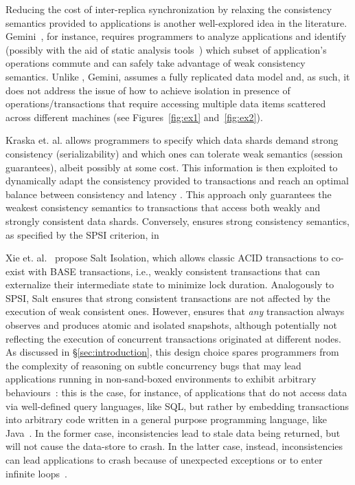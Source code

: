 Reducing the cost of inter-replica synchronization by relaxing the consistency semantics  provided to applications is another well-explored idea in the literature. Gemini~\cite{li2012making}, for instance, requires programmers to analyze applications and identify (possibly with the aid of static analysis tools~\cite{li2014automating}) which subset of application's operations commute and can safely take advantage of weak consistency semantics.  Unlike \specula, Gemini, assumes a fully replicated data model and, as such, it does not address the issue of how to achieve isolation in presence of operations/transactions that require accessing  multiple data items scattered across different machines (see Figures~\ref{fig:ex1} and~\ref{fig:ex2}). 

Kraska et. al. allows programmers to specify which data shards demand strong consistency (serializability)  and which ones can  tolerate weak semantics (session guarantees), albeit possibly at some cost. This information is then exploited to dynamically adapt the consistency provided to transactions and reach an optimal balance between consistency and latency \cite{kraska2009consistency}. This approach only guarantees the weakest consistency semantics to transactions that access both weakly and strongly consistent data shards. Conversely, \specula ensures strong consistency semantics, as specified by the SPSI criterion, in 

Xie et. al.~\cite{xie2014salt} propose Salt Isolation, which allows classic ACID transactions to co-exist with BASE transactions, i.e., weakly consistent transactions that can externalize their intermediate state to minimize lock duration. Analogously to SPSI, Salt ensures that strong consistent transactions are not affected by the execution of weak consistent ones. However,  \specula ensures that \textit{any} transaction always observes and produces atomic and isolated snapshots, although potentially not reflecting the execution of concurrent transactions originated at different nodes. As discussed in \S \ref{sec:introduction}, this design choice spares programmers from the complexity of reasoning on subtle concurrency bugs that may lead applications running in non-sand-boxed environments  to exhibit arbitrary behaviours~\cite{guerraoui2007opacity, imbs2012virtual}: this is the case, for instance, of applications that do not access data via well-defined query languages, like SQL, but rather by embedding transactions into arbitrary code written in a general purpose programming language, like Java~\cite{javaPersistenceAPI}. In the former case, inconsistencies lead to stale data being returned, but will not cause the data-store to crash. In the latter case, instead, inconsistencies can lead applications to crash because of unexpected exceptions or to enter infinite loops~\cite{felber2008transactions}. 


